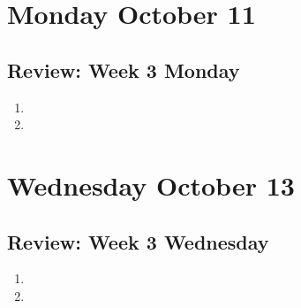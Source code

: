 

\section*{Monday October 11}



\newpage



\newpage
\subsection*{Review: Week 3 Monday}
\begin{enumerate}
    \item 
    \item 
\end{enumerate}
\newpage
\section*{Wednesday October 13}


\vfill

\vfill

\vfill



\vfill


\newpage

\newpage
\subsection*{Review: Week 3 Wednesday}
\begin{enumerate}
    \item 
    \item 
\end{enumerate}
\newpage
